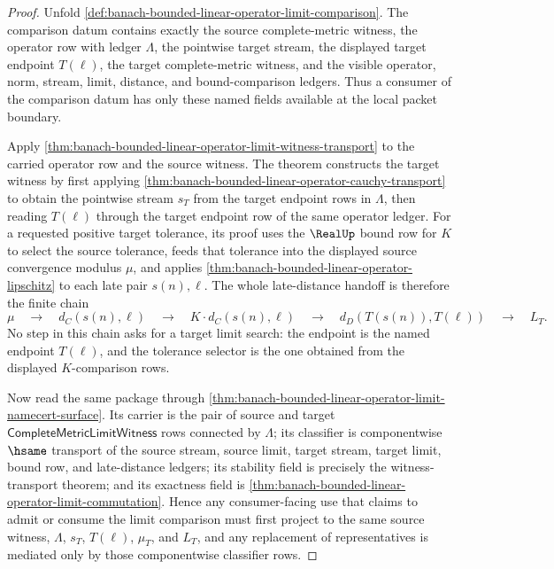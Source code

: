\begin{proof}
Unfold \autoref{def:banach-bounded-linear-operator-limit-comparison}. The
comparison datum contains exactly the source complete-metric witness, the
operator row with ledger $\Lambda$, the pointwise target stream, the displayed
target endpoint $T(\ell)$, the target complete-metric witness, and the visible
operator, norm, stream, limit, distance, and bound-comparison ledgers. Thus a
consumer of the comparison datum has only these named fields available at the
local packet boundary.

Apply \autoref{thm:banach-bounded-linear-operator-limit-witness-transport} to
the carried operator row and the source witness. The theorem constructs the
target witness by first applying
\autoref{thm:banach-bounded-linear-operator-cauchy-transport} to obtain the
pointwise stream $s_T$ from the target endpoint rows in $\Lambda$, then reading
$T(\ell)$ through the target endpoint row of the same operator ledger. For a
requested positive target tolerance, its proof uses the $\RealUp$ bound row for
$K$ to select the source tolerance, feeds that tolerance into the displayed
source convergence modulus $\mu$, and applies
\autoref{thm:banach-bounded-linear-operator-lipschitz} to each late pair
$s(n),\ell$. The whole late-distance handoff is therefore the finite chain
$$
\mu
\quad\longrightarrow\quad
 d_C(s(n),\ell)
\quad\longrightarrow\quad
 K\cdot d_C(s(n),\ell)
\quad\longrightarrow\quad
 d_D(T(s(n)),T(\ell))
\quad\longrightarrow\quad
 L_T.
$$
No step in this chain asks for a target limit search: the endpoint is the
named endpoint $T(\ell)$, and the tolerance selector is the one obtained from
the displayed $K$-comparison rows.

Now read the same package through
\autoref{thm:banach-bounded-linear-operator-limit-namecert-surface}. Its
carrier is the pair of source and target $\mathsf{CompleteMetricLimitWitness}$
rows connected by $\Lambda$; its classifier is componentwise $\hsame$ transport
of the source stream, source limit, target stream, target limit, bound row, and
late-distance ledgers; its stability field is precisely the witness-transport
theorem; and its exactness field is
\autoref{thm:banach-bounded-linear-operator-limit-commutation}. Hence any
consumer-facing use that claims to admit or consume the limit comparison must
first project to the same source witness, $\Lambda$, $s_T$, $T(\ell)$,
$\mu_T$, and $L_T$, and any replacement of representatives is mediated only by
those componentwise classifier rows.


\end{proof}
